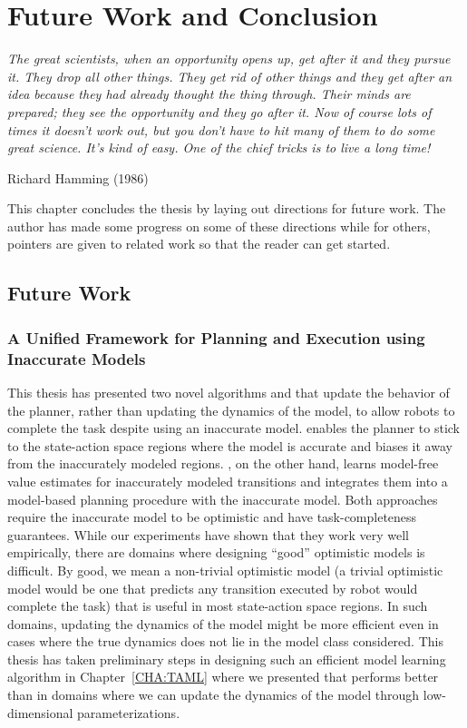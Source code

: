 
\chapter{Future Work and Conclusion}
\label{cha:future-work-concl}

\epigraph{\textit{The great scientists, when an opportunity opens up,
    get after it and they pursue it. They drop all other things. They
    get rid of other things and they get after an idea because they
    had already thought the thing through. Their minds are prepared;
    they see the opportunity and they go after it. Now of course lots
    of times it doesn't work out, but you don't have to hit many of
    them to do some great science. It's kind of easy. One of the chief
    tricks is to live a long time!}}{Richard Hamming (1986)}

This chapter concludes the thesis by laying out directions for future
work. The author has made some progress on some of these directions
while for others, pointers are given to related work so that the
reader can get started.

\section{Future Work}
\label{sec:future-work}

\subsection{A Unified Framework for Planning and Execution using
  Inaccurate Models}
\label{sec:unified-framework}

This thesis has presented two novel algorithms \cmax{} and \cmaxpp{} that update the
behavior of the planner, rather than updating the dynamics of the
model, to allow robots to complete the task despite using an
inaccurate model. \cmax{} enables the planner to stick to the
state-action space regions where the model is accurate and biases it
away from the inaccurately modeled regions. \cmaxpp{}, on the other
hand, learns model-free value estimates for inaccurately modeled
transitions and integrates them into a model-based planning procedure
with the inaccurate model. Both approaches require the inaccurate
model to be optimistic and have task-completeness guarantees. While
our experiments have shown that they work very well empirically, there
are domains where designing ``good'' optimistic models is
difficult. By good, we mean a non-trivial optimistic model (a trivial
optimistic model would be one that predicts any transition executed by
robot would complete the task) that is useful in most state-action
space regions. In such domains, updating the dynamics of the model
might be more efficient even in cases where the true dynamics does not
lie in the model class considered. This thesis has taken preliminary
steps in designing such an efficient model learning algorithm in
Chapter~\ref{CHA:TAML} where we presented \taml{} that performs better
than \cmax{} in domains where we can update the dynamics of the model
through low-dimensional parameterizations.

